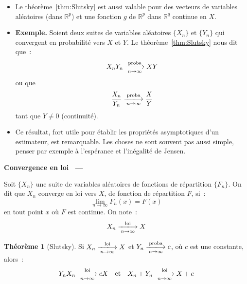 \documentclass[10pt,a4paper]{article}
\makeatletter
\theoremstyle{definition}
\newtheorem{theorem}{Théorème}
\renewcommand{\newline}{\unskip\par\vspace{1.5pt}}
\newenvironment{frame}[1][]{\par}{\par}
\newcommand{\frameheadrule}{%
  \par\nobreak\vspace{1pt}{\color{ctitle}\hrule height 0.6pt}\nobreak\vspace{4pt}}
\newcommand{\frametitle}[1]{%
  \par\addvspace{8pt plus 2pt}\needspace{6\baselineskip}%
  \noindent\begingroup\color{ctitle}\sffamily\bfseries\large #1\endgroup
  \@ifnextchar\framesubtitle{}{\frameheadrule}}
\newcommand{\framesubtitle}[1]{%
  \begingroup\color{ctitle}\sffamily\normalsize\ --- #1\endgroup\frameheadrule}
\makeatother
\begin{document}
\begin{notes}

  \begin{itemize}

  \item Le théorème~\ref{thm:Slutsky} est aussi valable pour des vecteurs de variables aléatoires (dans $\mathbb R^p$) et une fonction $g$ de $\mathbb R^p$ dans $\mathbb R^q$ continue en $X$.\newline

  \item \textbf{Exemple.} Soient deux suites de variables aléatoires $\{X_n\}$ et $\{Y_n\}$ qui convergent en probabilité vers $X$ et $Y$. Le théorème~\ref{thm:Slutsky} nous dit que~:
    \[
      X_nY_n \xlongrightarrow[n\rightarrow\infty]{\text{proba}} XY
    \]
    ou que
    \[
      \frac{X_n}{Y_n} \xlongrightarrow[n\rightarrow\infty]{\text{proba}} \frac{X}{Y}
    \]
    tant que $Y\neq 0$ (continuité).\newline

  \item Ce résultat, fort utile pour établir les propriétés asymptotiques d'un estimateur, est remarquable. Les choses ne sont souvent pas aussi simple, penser par exemple à l'espérance et l'inégalité de Jensen.

  \end{itemize}

\end{notes}

\begin{frame}
  \frametitle{Convergence en loi}

  \begin{defn}{}
    Soit $\{X_n\}$ une suite de variables aléatoires de fonctions de
    répartition $\{F_n\}$. On dit que $X_n$ converge en loi vers $X$, de
    fonction de répartition $F$, si~:
    \[
      \underset{n\rightarrow\infty}{\lim} F_n(x) = F(x)
    \]
    en tout point $x$ où $F$ est continue. On note~:
    \[
      X_n \xlongrightarrow[n\rightarrow\infty]{\text{loi}} X
    \]
  \end{defn}

  \bigskip

  \begin{theorem}[Slutsky]\label{thm:Slutsky:mixte}
    Si $X_n \xlongrightarrow[n\rightarrow\infty]{\text{loi}} X$ et
    $Y_n \xlongrightarrow[n\rightarrow\infty]{\text{proba}} c$, où $c$ est une
    constante, alors~:
    \[
      Y_nX_n \xlongrightarrow[n\rightarrow\infty]{\text{loi}} cX
      \quad\text{et}\quad
      X_n+Y_n \xlongrightarrow[n\rightarrow\infty]{\text{loi}} X+c
    \]
  \end{theorem}

\end{frame}
\end{document}
